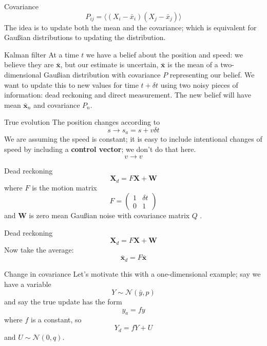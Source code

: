 \documentclass{beamer}
\newcommand{\crish}{\color{reddish}}
\newcommand{\cbla}{\color{black}}
\begin{document}
\begin{frame}{Covariance}
\crish$$
P_{ij}=\langle (X_i-\bar{x}_i)(X_j-\bar{x}_j)\rangle
$$\cbla{}
{The idea is to update both the mean and the covariance; which is
equivalent for Gau\ss{}ian distributions to updating the distribution.}
\end{frame}

\begin{frame}{Kalman filter}
 At a time \crish$t$\cbla{} we have a belief about the position and
 speed: we believe they are \crish$\mathbf{\bar{x}}$\cbla{}, but our
 estimate is uncertain, \crish$\mathbf{\bar{x}}$\cbla{} is the mean of
 a two-dimensional Gau\ss{}ian distribution with covariance
 \crish$P$\cbla{} representing our belief.
\vskip 1cm We want to update this to new values for time
\crish$t+\delta t$\cbla{} using two noisy pieces of information: dead
reckoning and direct measurement. The new belief will have mean
\crish$\mathbf{\bar{x}}_n$\cbla{} and covariance \crish$P_n$\cbla{}.
\end{frame}

\begin{frame}{True evolution}
  The position changes according to
  \crish$$ s\rightarrow s_a =
s+v\delta t
  $$\cbla{}
 We are assuming the speed is constant; it is easy to include intentional changes of speed by including a \textbf{control vector}; we don't do that here.
  \crish$$
  v\rightarrow v
  $$\cbla{}
\end{frame}

\begin{frame}{Dead reckoning}
\crish$$
\mathbf{X}_d=F\mathbf{X}+\mathbf{W}
$$\cbla{}
where \crish$F$\cbla{} is the motion matrix
\crish$$
F=\left(\begin{array}{cc}1&\delta t\\0&1\end{array}\right)
$$\cbla{} and \crish$\mathbf{W}$\cbla{} is zero mean Gau\ss{}ian noise
  with covariance matrix \crish$Q$\cbla{} .
\end{frame}

\begin{frame}{Dead reckoning}
\crish$$ \mathbf{X}_d=F\mathbf{X}+\mathbf{W}
$$\cbla{}
{Now take the average:}
\crish$$
\mathbf{\bar{x}}_d=F\mathbf{\bar{x}}
$$\cbla{}

\end{frame}

\begin{frame}{Change in covariance}
  Let's motivate this with a one-dimensional example; say we have a
  variable
  \crish$$Y\sim\mathcal{N}(\bar{y},p)$$\cbla{}
  {and say the true update has the form} \crish$$y_a=fy
  $$\cbla{} {where \crish$f$\cbla{} is a constant, so
    \crish$$Y_d=fY+U$$\cbla{} and
    \crish$U\sim\mathcal{N}(0,q)$\cbla{}.}
\end{frame}
\end{document}
